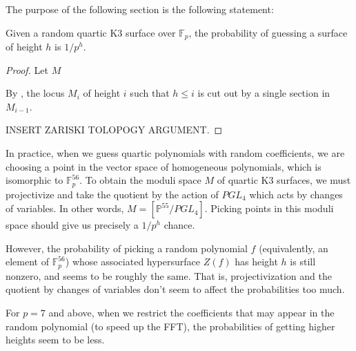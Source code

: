 
The purpose of the following section is the following statement:

\begin{thm}
	Given a random quartic K3 surface over \(\mathbb{F}_{p}\),
	the probability of guessing a surface of height \(h\) 
	is \(1 / p^{h}\).
\end{thm}

\begin{proof}
	Let \(M\)

	By \cite[Section~7]{artin-1974-k3-surfaces}, 
	the locus \(M_{i}\) of height \(i\) such that \(h \leq i\)
	is cut out by a single section in 
	\(M_{i-1}\).

	INSERT ZARISKI TOLOPOGY ARGUMENT.
\end{proof}

In practice, when we guess quartic polynomials with random coefficients,
we are choosing a point in the vector space
of homogeneous polynomials, which is isomorphic to
\(\mathbb{F}_{p}^{56}\).
To obtain the moduli space \(M\) of quartic K3 surfaces, 
we must projectivize and take the quotient by the action of 
\(PGL_{4}\) which acts by changes of variables. 
In other words, \(M = \left[  \mathbb{P}^{55} / PGL_{4} \right] \).
Picking points in this moduli space should give us precisely
a  \(1 / p^{h}\) chance. 

However, the probability of picking a random
polynomial \(f\)
(equivalently, an element of \(\mathbb{F}_{p}^{56}\))
whose associated hypersurface
\(Z(f)\) has height \(h\) is still nonzero,
and seems to be roughly the same.
That is, projectivization
and the quotient by changes of variables 
don't seem to affect the probabilities
too much. 
 
For \(p = 7\) and above, when we restrict the coefficients
that may appear in the random polynomial (to speed up the FFT),
the probabilities of getting higher heights
seem to be less.
